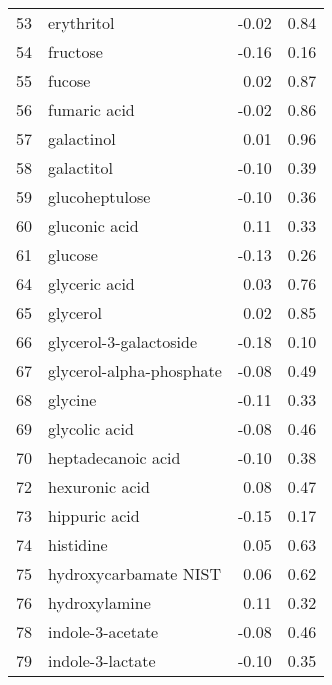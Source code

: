 \begin{tabular}{llrr}
53  &                         erythritol &                -0.02 &     0.84 \\
54  &                           fructose &                -0.16 &     0.16 \\
55  &                             fucose &                 0.02 &     0.87 \\
56  &                       fumaric acid &                -0.02 &     0.86 \\
57  &                         galactinol &                 0.01 &     0.96 \\
58  &                         galactitol &                -0.10 &     0.39 \\
59  &                     glucoheptulose &                -0.10 &     0.36 \\
60  &                      gluconic acid &                 0.11 &     0.33 \\
61  &                            glucose &                -0.13 &     0.26 \\
64  &                      glyceric acid &                 0.03 &     0.76 \\
65  &                           glycerol &                 0.02 &     0.85 \\
66  &             glycerol-3-galactoside &                -0.18 &     0.10 \\
67  &           glycerol-alpha-phosphate &                -0.08 &     0.49 \\
68  &                            glycine &                -0.11 &     0.33 \\
69  &                      glycolic acid &                -0.08 &     0.46 \\
70  &                 heptadecanoic acid &                -0.10 &     0.38 \\
72  &                     hexuronic acid &                 0.08 &     0.47 \\
73  &                      hippuric acid &                -0.15 &     0.17 \\
74  &                          histidine &                 0.05 &     0.63 \\
75  &              hydroxycarbamate NIST &                 0.06 &     0.62 \\
76  &                      hydroxylamine &                 0.11 &     0.32 \\
78  &                   indole-3-acetate &                -0.08 &     0.46 \\
79  &                   indole-3-lactate &                -0.10 &     0.35 \\

\end{tabular}
